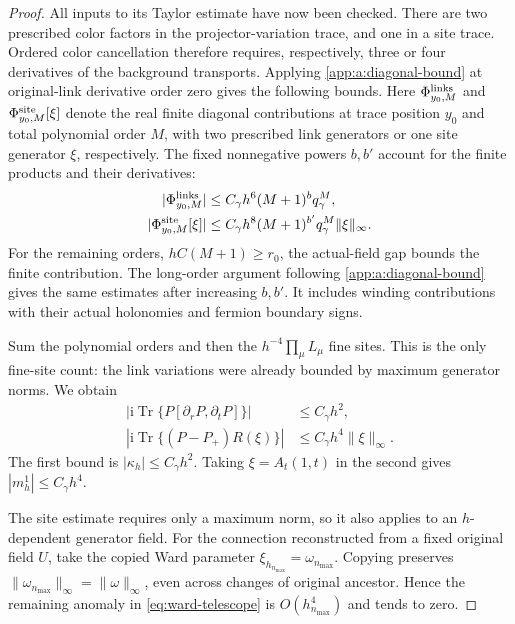 \documentclass[11pt,a4paper]{article}
\theoremstyle{remark}
\DeclareMathOperator{\Tr}{Tr}
\newcommand{\ii}{\mathrm i}
\begin{document}
\begin{proof}
All inputs to its Taylor estimate have now been checked. There are two
prescribed color factors in the projector-variation trace, and one in
a site trace. Ordered color cancellation therefore requires, respectively,
three or four derivatives of the background transports. Applying
\eqref{app:a:diagonal-bound} at original-link derivative order zero gives
the following bounds. Here $\Phi^{\rm links}_{y_0,M}$ and
$\Phi^{\rm site}_{y_0,M}[\xi]$ denote the real finite diagonal
contributions at trace position $y_0$ and total polynomial order $M$,
with two prescribed link generators or one site generator $\xi$,
respectively. The fixed nonnegative powers $b,b'$ account for
the finite products and their derivatives:
\begin{equation}
 \begin{aligned}
 |\Phi^{\rm links}_{y_0,M}|&\le
 C_\gamma h^6(M+1)^bq_\gamma^M,\\
 |\Phi^{\rm site}_{y_0,M}[\xi]|&\le
 C_\gamma h^8(M+1)^{b'}q_\gamma^M\|\xi\|_\infty .
 \end{aligned}
\end{equation}
For the remaining orders, $hC(M+1)\ge r_0$, the actual-field gap
bounds the finite contribution. The long-order argument following
\eqref{app:a:diagonal-bound} gives the same estimates after increasing
$b,b'$. It includes winding contributions with their actual holonomies
and fermion boundary signs.

Sum the polynomial orders and then the $h^{-4}\prod_\mu L_\mu$
fine sites. This is the only fine-site count: the link variations were
already bounded by maximum generator norms. We obtain
\begin{equation}
 \begin{aligned}
 \left|\ii\Tr\{P[\partial_rP,\partial_tP]\}\right|&\le C_\gamma h^2,\\
 \left|\ii\Tr\{(P-P_+)R(\xi)\}\right|
       &\le C_\gamma h^4\|\xi\|_\infty .
 \end{aligned}
\end{equation}
The first bound is $|\kappa_h|\le C_\gamma h^2$. Taking
$\xi=A_t(1,t)$ in the second gives $|m_h^1|\le C_\gamma h^4$.

The site estimate requires only a maximum norm, so it also applies to
an $h$-dependent generator field. For the connection reconstructed from
a fixed original field $U$, take the copied Ward parameter
$\xi_{h_{n_{\max}}}=\omega_{n_{\max}}$. Copying preserves
$\|\omega_{n_{\max}}\|_\infty=\|\omega\|_\infty$, even across
changes of original ancestor. Hence the remaining anomaly in
\eqref{eq:ward-telescope} is $O(h_{n_{\max}}^4)$ and tends to zero.
\end{proof}
\end{document}
